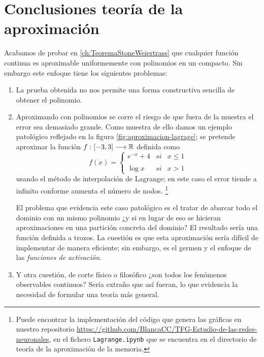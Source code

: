 \section{Conclusiones teoría de la aproximación} 
\label{ch03:conclusiones-teoria-aproximacion}
Acabamos de probar en \ref{ch:TeoremaStoneWeiertrass} que cualquier función 
continua es aproximable uniformemente con polinomios en un compacto. 
Sin embargo este enfoque tiene los siguientes problemas: 

\begin{enumerate}
    \item La prueba obtenida no nos permite 
    una forma constructiva sencilla de obtener el polinomio. 
    \item Aproximando con polinomios se corre el riesgo de que fuera de la muestra 
    el error sea demasiado grande. Como muestra de ello damos un ejemplo patológico 
    reflejado en la figura \ref{fig:aproximacion-lagrage}; se pretende aproximar 
    la función $f:[-3,3] \longrightarrow \mathbb{R}$ definida como
    \begin{equation*}
        f(x)= \left\{ \begin{array}{lcc}
            e^{-x} + 4 &   si  & x \leq 1 \\
            \\ \log{x} &  si  & x > 1
            \end{array}
  \right.
    \end{equation*}
    usando el método de interpolación de Lagrange; en este caso el error tiende a 
    infinito conforme aumenta el número de nodos. \footnote{Puede encontrar la implementación
    del código que genera las gráficas en nuestro repositorio 
    \url{https://github.com/BlancaCC/TFG-Estudio-de-las-redes-neuronales}, 
    en el fichero \texttt{Lagrange.ipynb} que se encuentra  en el directorio de teoría de la aproximación de la memoria. } 

    El problema que evidencia este caso patológico es el tratar de abarcar todo el dominio 
con un mismo polinomio ¿y si en lugar de eso se hicieran aproximaciones 
en una partición concreta del dominio? El resultado sería una función definida a trozos.   
La cuestión es que esta aproximación sería difícil de implementar de manera eficiente;
sin embargo, es el germen y el enfoque de las \textit{funciones de activación}. 

    \item Y otra cuestión, de corte físico o  filosófico ¿son todos los fenómenos observables continuos? 
    Sería extraño que así fueran, lo que evidencia la necesidad de formular una teoría más general. 
\end{enumerate}



